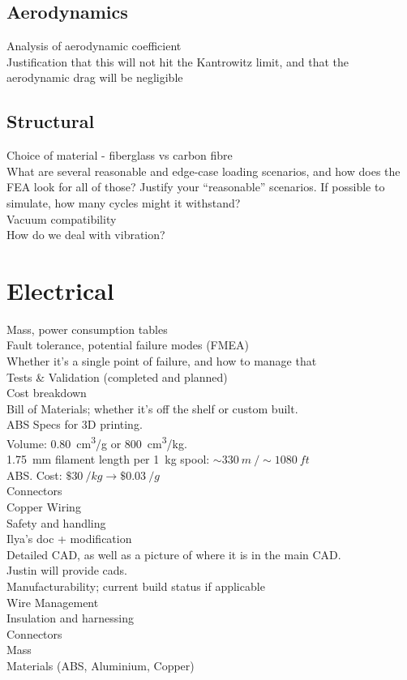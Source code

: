 \documentclass{report}
\begin{document}
    \subsection{Aerodynamics}
    Analysis of aerodynamic coefficient\\
    Justification that this will not hit the Kantrowitz limit, and that the aerodynamic drag will be negligible
    
    \subsection{Structural}
    Choice of material - fiberglass vs carbon fibre\\
    What are several reasonable and edge-case loading scenarios, and how does the FEA look for all of those? Justify your “reasonable” scenarios. If possible to simulate, how many cycles might it withstand?\\
    Vacuum compatibility\\
    How do we deal with vibration?
    
    \section{Electrical}
    Mass, power consumption tables\\
    Fault tolerance, potential failure modes (FMEA)\\
    Whether it’s a single point of failure, and how to manage that\\
    Tests \& Validation (completed and planned)\\
    Cost breakdown\\
    Bill of Materials; whether it’s off the shelf or custom built.\\
    
    ABS Specs for 3D printing.\\
    Volume: \SI{0.80}{cm^3/g} or \SI{800}{cm^3/kg}.\\
    \SI{1.75}{mm} filament length per \SI{1}{kg} spool: $\sim \SI{330}{m}\ / \sim \SI{1080}{ft}$\\
    ABS. Cost: $\$\SI{30}{/kg} \rightarrow \$\SI{0.03}{/g}$\\
    
    Connectors\\
    
    Copper Wiring\\
    
    
    
    
    Safety and handling\\
    Ilya’s doc + modification\\
    Detailed CAD, as well as a picture of where it is in the main CAD.\\
    Justin will provide cads. \\
    Manufacturability; current build status if applicable\\
    Wire Management\\
    Insulation and harnessing\\
    Connectors\\
    Mass \\
    Materials (ABS, Aluminium, Copper)\\
    
\end{document}
